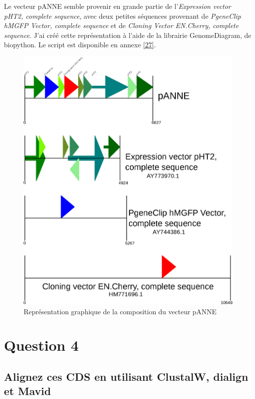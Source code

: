 \documentclass[10.9pt]{article} %
\begin{document}
Le vecteur pANNE semble provenir en grande partie de l'\emph{Expression vector pHT2, complete
sequence}, avec deux petites séquences provenant de \emph{PgeneClip hMGFP Vector, complete
sequence} et de \emph{Cloning Vector EN.Cherry, complete sequence}. J'ai créé cette représentation
à l'aide de la librairie GenomeDiagram, de biopython. Le script est disponible en annexe \ref{27}.
\begin{figure}
\includegraphics[width=\linewidth]{pANNE.eps}
\caption{Représentation graphique de la composition du vecteur pANNE}
\label{fig:first}
\end{figure}


\section{Question 4} %

\subsection[Alignement multiple]{Alignez ces CDS en utilisant ClustalW, dialign et Mavid}
\end{document}
